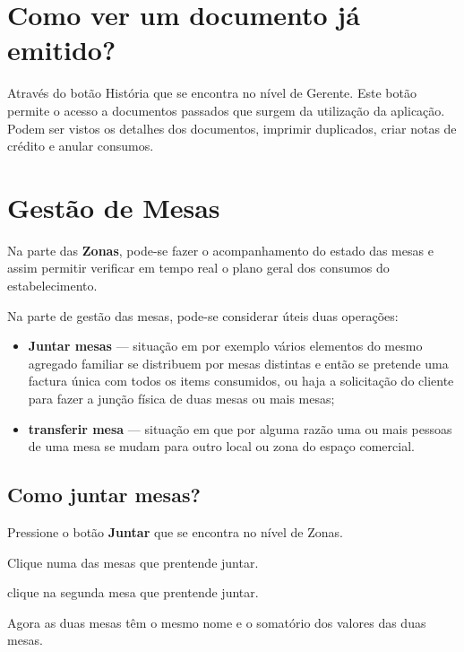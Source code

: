 \documentclass[a4paper,11pt,openany]{memoir}
\begin{document}
\section{Como ver um documento já emitido?}
Através do botão História que se encontra no nível de Gerente.
Este botão permite o
acesso a documentos passados que surgem da utilização da aplicação. Podem ser
vistos os detalhes dos documentos, imprimir duplicados,
criar notas de crédito e anular consumos.

% 

\section{Gestão de Mesas}

\label{VendaArtigos}
Na parte das \textbf{Zonas}, pode-se fazer o acompanhamento do estado das mesas e assim
permitir verificar em tempo real o plano geral dos consumos do estabelecimento.

Na parte de gestão das mesas, pode-se considerar úteis duas operações:
\begin{itemize}
\item \textbf{Juntar mesas} --- situação em por exemplo vários elementos do mesmo agregado familiar
se distribuem por mesas distintas e então se pretende uma factura única com todos os items
consumidos, ou haja a solicitação do cliente para fazer a junção física de duas mesas ou mais mesas;
\item \textbf{transferir mesa} --- situação em que por alguma razão uma ou mais pessoas de uma mesa
se mudam para outro local ou zona do espaço comercial. 
\end{itemize}

\subsection{Como juntar mesas?}

Pressione o botão \textbf{Juntar} que se encontra no nível de Zonas.

Clique numa das mesas que prentende juntar.

clique na segunda mesa que prentende juntar.

Agora as duas mesas têm o mesmo nome e o somatório dos valores das duas mesas.
\end{document}
